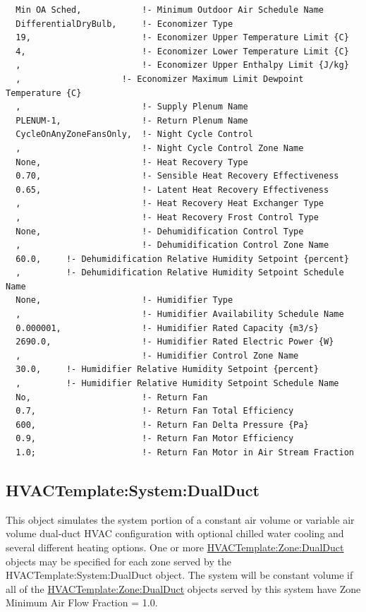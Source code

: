 \begin{lstlisting}
  Min OA Sched,            !- Minimum Outdoor Air Schedule Name
  DifferentialDryBulb,     !- Economizer Type
  19,                      !- Economizer Upper Temperature Limit {C}
  4,                       !- Economizer Lower Temperature Limit {C}
  ,                        !- Economizer Upper Enthalpy Limit {J/kg}
  ,                    !- Economizer Maximum Limit Dewpoint Temperature {C}
  ,                        !- Supply Plenum Name
  PLENUM-1,                !- Return Plenum Name
  CycleOnAnyZoneFansOnly,  !- Night Cycle Control
  ,                        !- Night Cycle Control Zone Name
  None,                    !- Heat Recovery Type
  0.70,                    !- Sensible Heat Recovery Effectiveness
  0.65,                    !- Latent Heat Recovery Effectiveness
  ,                        !- Heat Recovery Heat Exchanger Type
  ,                        !- Heat Recovery Frost Control Type
  None,                    !- Dehumidification Control Type
  ,                        !- Dehumidification Control Zone Name
  60.0,     !- Dehumidification Relative Humidity Setpoint {percent}
  ,         !- Dehumidification Relative Humidity Setpoint Schedule Name
  None,                    !- Humidifier Type
  ,                        !- Humidifier Availability Schedule Name
  0.000001,                !- Humidifier Rated Capacity {m3/s}
  2690.0,                  !- Humidifier Rated Electric Power {W}
  ,                        !- Humidifier Control Zone Name
  30.0,     !- Humidifier Relative Humidity Setpoint {percent}
  ,         !- Humidifier Relative Humidity Setpoint Schedule Name
  No,                      !- Return Fan
  0.7,                     !- Return Fan Total Efficiency
  600,                     !- Return Fan Delta Pressure {Pa}
  0.9,                     !- Return Fan Motor Efficiency
  1.0;                     !- Return Fan Motor in Air Stream Fraction
\end{lstlisting}

\subsection{HVACTemplate:System:DualDuct}\label{hvactemplatesystemdualduct}

This object simulates the system portion of a constant air volume or variable air volume dual-duct HVAC configuration with optional chilled water cooling and several different heating options. One or more \hyperref[hvactemplatezonedualduct]{HVACTemplate:Zone:DualDuct} objects may be specified for each zone served by the HVACTemplate:System:DualDuct object. The system will be constant volume if all of the \hyperref[hvactemplatezonedualduct]{HVACTemplate:Zone:DualDuct} objects served by this system have Zone Minimum Air Flow Fraction = 1.0.

